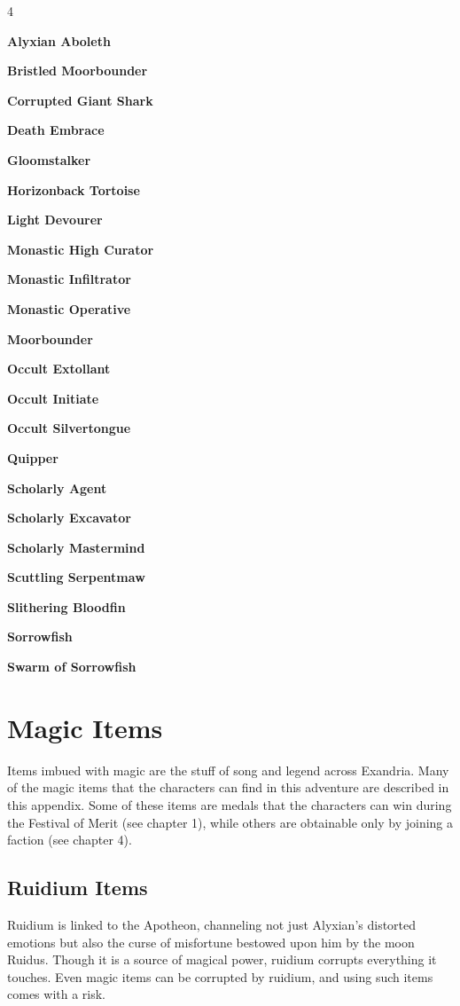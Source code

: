\documentclass[10pt,a4paper,twoside,bg=print,twocolumn,openany,nodeprecatedcode]{dndbook}
\begin{document}
\begin{itemize}
\begin{multicols}{4}
\item \textbf{Alyxian Aboleth}
\item \textbf{Bristled Moorbounder}
\item \textbf{Corrupted Giant Shark}
\item \textbf{Death Embrace}
\item \textbf{Gloomstalker}
\item \textbf{Horizonback Tortoise}
\item \textbf{Light Devourer}
\item \textbf{Monastic High Curator}
\item \textbf{Monastic Infiltrator}
\item \textbf{Monastic Operative}
\item \textbf{Moorbounder}
\item \textbf{Occult Extollant}
\item \textbf{Occult Initiate}
\item \textbf{Occult Silvertongue}
\item \textbf{Quipper}
\item \textbf{Scholarly Agent}
\item \textbf{Scholarly Excavator}
\item \textbf{Scholarly Mastermind}
\item \textbf{Scuttling Serpentmaw}
\item \textbf{Slithering Bloodfin}
\item \textbf{Sorrowfish}
\item \textbf{Swarm of Sorrowfish}
\end{multicols}

\end{itemize}

\chapter{Magic Items}
Items imbued with magic are the stuff of song and legend across Exandria. Many of the magic items that the characters can find in this adventure are described in this appendix. Some of these items are medals that the characters can win during the Festival of Merit (see chapter 1), while others are obtainable only by joining a faction (see chapter 4).

\section{Ruidium Items}
Ruidium is linked to the Apotheon, channeling not just Alyxian's distorted emotions but also the curse of misfortune bestowed upon him by the moon Ruidus. Though it is a source of magical power, ruidium corrupts everything it touches. Even magic items can be corrupted by ruidium, and using such items comes with a risk.
\end{document}
